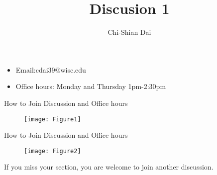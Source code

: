 \documentclass{beamer}
\title{Discusion 1}
\author{Chi-Shian Dai}
\begin{document}
\frame{\maketitle} %


\begin{frame}
	\begin{itemize}
	\item 	Email:cdai39@wisc.edu
	\item    Office hours: Monday and Thursday 1pm-2:30pm
	\end{itemize}

	
\end{frame}
\begin{frame}{How to Join Discussion and Office hours}
\begin{figure}
	\centering
	\texttt{[image: Figure1]}

\end{figure}

\end{frame}

\begin{frame}{How to Join Discussion and Office hours}
	\begin{figure}
		\centering
		\texttt{[image: Figure2]}
	\end{figure}
If you miss your section, you are welcome to join another discussion.
\end{frame}
\end{document}

